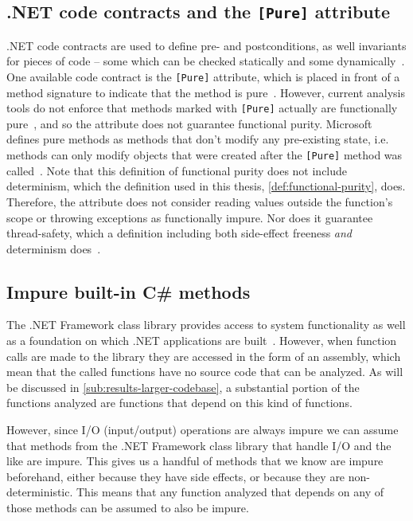 \documentclass[a4paper,12pt]{article}
\begin{document}
\subsection{.NET code contracts and the \texttt{[Pure]} attribute} \label{sub:code-contracts}

.NET code contracts are used to define pre- and postconditions, as well invariants for pieces of code -- some which can be checked statically and some dynamically~\cite{microsoft-code-contracts}. One available code contract is the \texttt{[Pure]} attribute, which is placed in front of a method signature to indicate that the method is pure~\cite{microsoft-code-contracts}. However, current analysis tools do not enforce that methods marked with \texttt{[Pure]} actually are functionally pure~\cite{microsoft-pure-attribute}, and so the attribute does not guarantee functional purity. Microsoft defines pure methods as methods that don't modify any pre-existing state, i.e. methods can only modify objects that were created after the \texttt{[Pure]} method was called~\cite{microsoft-code-contracts}. Note that this definition of functional purity does not include determinism, which the definition used in this thesis, \autoref{def:functional-purity}, does. Therefore, the attribute does not consider reading values outside the function's scope or throwing exceptions as functionally impure. Nor does it guarantee thread-safety, which a definition including both side-effect freeness \textit{and} determinism does~\cite{purity-in-java}.

\subsection{Impure built-in C\# methods} \label{sub:Impure-built-in-methods}

The .NET Framework class library provides access to system functionality as well as a foundation on which .NET applications are built~\cite{microsoft-dotnet-class-library}. However, when function calls are made to the library they are accessed in the form of an assembly, which mean that the called functions have no source code that can be analyzed. As will be discussed in \autoref{sub:results-larger-codebase}, a substantial portion of the functions analyzed are functions that depend on this kind of functions.

However, since I/O (input/output) operations are always impure we can assume that methods from the .NET Framework class library that handle I/O and the like are impure. This gives us a handful of methods that we know are impure beforehand, either because they have side effects, or because they are non-deterministic. This means that any function analyzed that depends on any of those methods can be assumed to also be impure.
\end{document}

